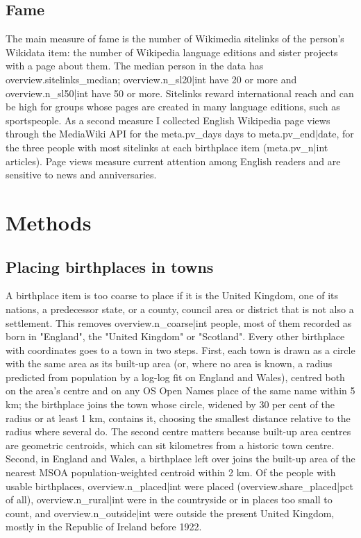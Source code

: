 \documentclass[11pt,a4paper]{article}
\begin{document}
\subsection{Fame}

The main measure of fame is the number of Wikimedia sitelinks of the person's Wikidata item: the number of Wikipedia language editions and sister projects with a page about them. The median person in the data has {{overview.sitelinks_median}}; {{overview.n_sl20|int}} have 20 or more and {{overview.n_sl50|int}} have 50 or more. Sitelinks reward international reach and can be high for groups whose pages are created in many language editions, such as sportspeople. As a second measure I collected English Wikipedia page views through the MediaWiki API for the {{meta.pv_days}} days to {{meta.pv_end|date}}, for the three people with most sitelinks at each birthplace item ({{meta.pv_n|int}} articles). Page views measure current attention among English readers and are sensitive to news and anniversaries.

\section{Methods}

\subsection{Placing birthplaces in towns}

A birthplace item is too coarse to place if it is the United Kingdom, one of its nations, a predecessor state, or a county, council area or district that is not also a settlement. This removes {{overview.n_coarse|int}} people, most of them recorded as born in "England", the "United Kingdom" or "Scotland". Every other birthplace with coordinates goes to a town in two steps. First, each town is drawn as a circle with the same area as its built-up area (or, where no area is known, a radius predicted from population by a log-log fit on England and Wales), centred both on the area's centre and on any OS Open Names place of the same name within 5 km; the birthplace joins the town whose circle, widened by 30 per cent of the radius or at least 1 km, contains it, choosing the smallest distance relative to the radius where several do. The second centre matters because built-up area centres are geometric centroids, which can sit kilometres from a historic town centre. Second, in England and Wales, a birthplace left over joins the built-up area of the nearest MSOA population-weighted centroid within 2 km. Of the people with usable birthplaces, {{overview.n_placed|int}} were placed ({{overview.share_placed|pct}} of all), {{overview.n_rural|int}} were in the countryside or in places too small to count, and {{overview.n_outside|int}} were outside the present United Kingdom, mostly in the Republic of Ireland before 1922.
\end{document}
